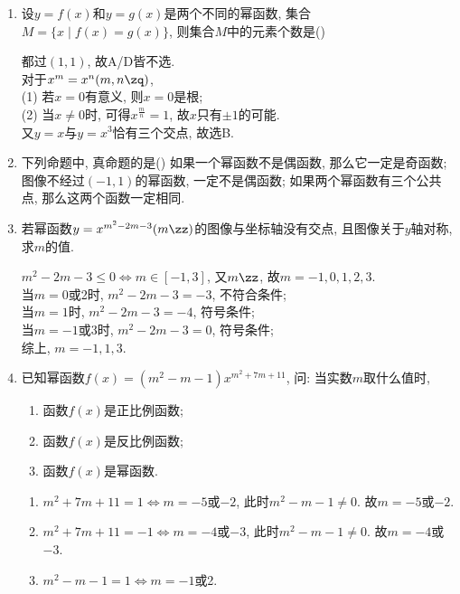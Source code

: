 \begin{enumerate}
\item 设$y=f(x)$和$y=g(x)$是两个不同的幂函数, 集合$M=\{x\mid f(x)=g(x)\}$, 则集合$M$中的元素个数是\dotfill()
\begin{jieda}
都过$(1,1)$, 故A/D皆不选. \\
对于$x^m=x^n(m,n\zq)$, \\
(1) 若$x=0$有意义, 则$x=0$是根; \\
(2) 当$x\neq 0$时, 可得$x^{\frac{m}{n}}=1$, 故$x$只有$\pm1$的可能. \\
又$y=x$与$y=x^3$恰有三个交点, 故选B.  
\end{jieda}

\item 下列命题中, 真命题的是\dotfill()
{如果一个幂函数不是偶函数, 那么它一定是奇函数;}
{图像不经过$(-1,1)$的幂函数, 一定不是偶函数;}
{如果两个幂函数有三个公共点, 那么这两个函数一定相同.}


\item 若幂函数$y=x^{m^2-2m-3}(m\zz)$的图像与坐标轴没有交点, 且图像关于$y$轴对称, 求$m$的值. 
\begin{jieda}
$m^2-2m-3 \leq 0\iff m\in[-1,3]$, 又$m\zz$, 故$m=-1,0,1,2,3$. \\
当$m=0$或2时, $m^2-2m-3=-3$, 不符合条件; \\
当$m=1$时, $m^2-2m-3=-4$, 符号条件; \\
当$m=-1$或3时, $m^2-2m-3=0$, 符号条件; \\
综上, $m=-1,1,3$. 
\end{jieda}


\item 已知幂函数$f(x)=(m^2-m-1)x^{m^2+7m+11}$, 问: 当实数$m$取什么值时, 
\begin{enumerate}
\item 函数$f(x)$是正比例函数; 
\item 函数$f(x)$是反比例函数; 
\item 函数$f(x)$是幂函数. 
\end{enumerate}
\begin{jieda}
\begin{enumerate}[(1)]
\item $m^2+7m+11=1\iff m=-5$或$-2$, 此时$m^2-m-1\neq 0$. 故$m=-5$或$-2$. 

\item $m^2+7m+11=-1\iff m=-4$或$-3$, 此时$m^2-m-1\neq 0$. 故$m=-4$或$-3$. 

\item $m^2-m-1=1\iff m=-1$或2. 
\end{enumerate}
\end{jieda}
\begin{vspace_}
\vsp[3]
\end{vspace_}



\end{enumerate}
